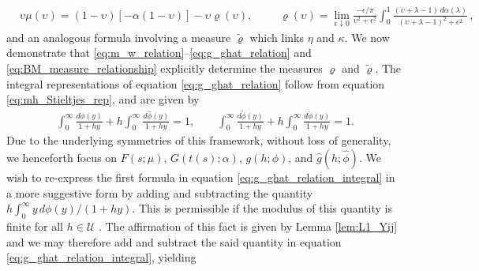\documentclass[english,12pt,jmp,graphicx]{revtex4-1}
\newcommand{\ph}{\hat{\phi}}
\newcommand{\pt}{\tilde{\phi}}
\newcommand{\pc}{\check{\phi}}
\begin{document}
\begin{align}\label{eq:BM_measure_relationship}
  &\upsilon\mu(\upsilon)=(1-\upsilon)[-\alpha(1-\upsilon)] - \upsilon\varrho(\upsilon), &&
  &\varrho(\upsilon)=%
       \lim_{\epsilon\downarrow 0}\frac{-\epsilon/\pi}{\upsilon^2+\epsilon^2}
         \int_0^1\frac{(\upsilon+\lambda-1)\,d\alpha(\lambda)}{(\upsilon+\lambda-1)^2+\epsilon^2}\,,&&
\end{align}
%
and an analogous formula involving a measure $\tilde{\varrho}$ which links $\eta$ and $\kappa$.
We now demonstrate that \eqref{eq:m_w_relation}--\eqref{eq:g_ghat_relation}
and \eqref{eq:BM_measure_relationship} explicitly determine the
measures $\varrho$ and $\tilde{\varrho}$. The integral representations of equation
\eqref{eq:g_ghat_relation} follow from equation
\eqref{eq:mh_Stieltjes_rep}, and are given by  
%
\begin{align}\label{eq:g_ghat_relation_integral}
  \int_0^\infty\frac{d\phi(y)}{1+hy}+h\int_0^\infty\frac{d\ph(y)}{1+hy}=1,\qquad
  \int_0^\infty\frac{d\pt(y)}{1+hy}+h\int_0^\infty\frac{d\pc(y)}{1+hy}=1.
\end{align}
%
Due to the underlying symmetries of this framework, without loss of
generality, we henceforth focus on $F(s;\mu)$, $G(t(s);\alpha)$, $g(h;\phi)$,
and $\hat{g}(h;\ph)$. We wish to re-express the first formula in
equation \eqref{eq:g_ghat_relation_integral} in a more suggestive form
by adding and subtracting the quantity
$h\int_0^\infty y\,d\phi(y)/(1+hy)$. This is permissible if the modulus of
this quantity is finite for all $h\in\mathcal{U}$
\cite{Rudin:87,Folland:95}. The affirmation of this fact is given by
Lemma \ref{lem:L1_Yij} and we may therefore add and
subtract the said quantity in equation \eqref{eq:g_ghat_relation_integral}, yielding   
\end{document}
